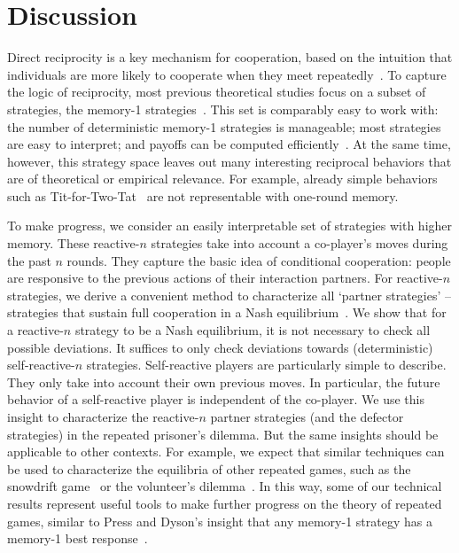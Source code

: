 \documentclass[9pt,twocolumn,twoside]{pnas-new}
\begin{document}
       


\section*{Discussion}

Direct reciprocity is a key mechanism for cooperation, based on the intuition that individuals are more likely to cooperate when they meet repeatedly~\citep{nowak:Science:2006}.
To capture the logic of reciprocity, most previous theoretical studies focus on a subset of strategies, the  memory-1 strategies~\citep{nowak:Nature:1993,imhof:PNAS:2005,grujic:jtb:2012,van-segbroeck:prl:2012,press:PNAS:2012,stewart:pnas:2013,Toupo:IJBC:2014,stewart:pnas:2014, akin:EGADS:2016,glynatsi:scientific:2020,chen:PNASnexus:2023}. 
This set is comparably easy to work with: 
the number of deterministic memory-1 strategies is manageable; most strategies are easy to interpret; and payoffs can be computed efficiently~\citep{sigmund2010}. 
At the same time, however, this strategy space leaves out many interesting reciprocal behaviors that are of theoretical or empirical relevance.
For example, already simple behaviors such as Tit-for-Two-Tat~\citep{axelrod:AAAS:1981} are not representable with one-round memory.

To make progress, we consider an easily interpretable set of strategies with higher memory. 
These reactive-$n$ strategies take into account a co-player's moves during the past $n$ rounds. 
They capture the basic idea of conditional cooperation: people are responsive to the previous actions of their interaction partners. 
For reactive-$n$ strategies, we derive a convenient method to characterize all `partner strategies' -- strategies that sustain full cooperation in a Nash equilibrium~\citep{akin:EGADS:2016,Hilbe:GEB:2015}. 
We show that for a reactive-$n$ strategy to be a Nash equilibrium, it is not necessary to check all possible deviations. 
It suffices to only check deviations towards (deterministic) self-reactive-$n$ strategies. 
Self-reactive players are particularly simple to describe. 
They only take into account their own previous moves. 
In particular, the future behavior of a self-reactive player is independent of the co-player. 
We use this insight to characterize the reactive-$n$ partner strategies (and the defector strategies) in the repeated prisoner's dilemma.
But the same insights should be applicable to other contexts. 
For example, we expect that similar techniques can be used to characterize the equilibria of other repeated games, such as the snowdrift game~\citep{doebeli:EL:2005} or the volunteer's dilemma~\citep{diekmann:jcr:1985}.  
In this way, some of our technical results represent useful tools to make further progress on the theory of repeated games, similar to Press and Dyson's insight that any memory-1 strategy has a memory-1 best response~\citep{press:PNAS:2012}. 
\end{document}
